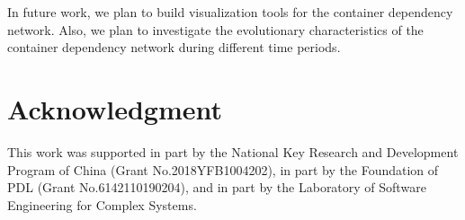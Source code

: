 \documentclass[sigconf]{acmart}
\begin{document}
In future work, we plan to build visualization tools for the container dependency network. Also, we plan to investigate the evolutionary characteristics of the container dependency network during different time periods. 


\section*{Acknowledgment}This work was supported in part by the National Key Research and Development Program of China (Grant No.2018YFB1004202), in part by the Foundation of PDL (Grant No.6142110190204), and in part by the Laboratory of Software Engineering for Complex Systems.




\end{document}
